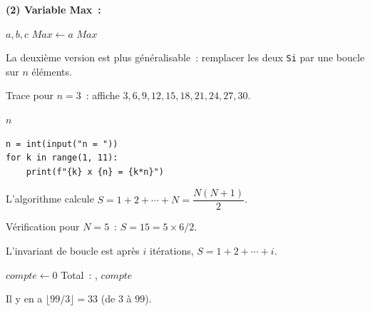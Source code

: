 \textbf{(2) Variable Max~:}
\begin{algorithm}[H]
\caption{Maximum (variable Max)}
\Lire $a, b, c$\;
$\mathit{Max} \leftarrow a$\;
\Afficher $\mathit{Max}$\;
\end{algorithm}

La deuxi\`eme version est plus g\'en\'eralisable~: remplacer les deux \texttt{Si}
par une boucle sur $n$ \'el\'ements.


Trace pour $n=3$~: affiche $3, 6, 9, 12, 15, 18, 21, 24, 27, 30$.

\begin{algorithm}[H]
\caption{Table de $n$}
\Lire $n$\;
\end{algorithm}

\begin{lstlisting}[style=python]
n = int(input("n = "))
for k in range(1, 11):
    print(f"{k} x {n} = {k*n}")
\end{lstlisting}


L'algorithme calcule $S = 1 + 2 + \cdots + N = \dfrac{N(N+1)}{2}$.

V\'erification pour $N=5$~: $S=15=5\times6/2$.\checkmark

L'invariant de boucle est \og apr\`es $i$ it\'erations, $S=1+2+\cdots+i$\fg.


\begin{algorithm}[H]
\caption{Multiples de 3 $< 100$}
$\mathit{compte} \leftarrow 0$\;
\Afficher \og Total~: \fg, $\mathit{compte}$\;
\end{algorithm}

Il y en a $\lfloor 99/3\rfloor = 33$ (de $3$ \`a $99$).


